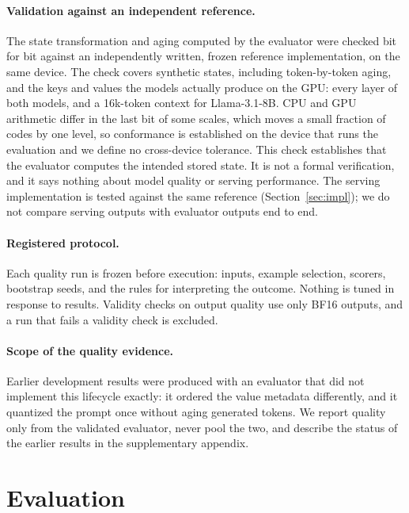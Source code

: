 \documentclass{article}
\begin{document}
\paragraph{Validation against an independent reference.}
The state transformation and aging computed by the evaluator were checked bit for bit against an
independently written, frozen reference implementation, on the same device. The check covers synthetic
states, including token-by-token aging, and the keys and values the models actually produce on the GPU:
every layer of both models, and a 16k-token context for Llama-3.1-8B. CPU and GPU arithmetic differ in
the last bit of some scales, which moves a small fraction of codes by one level, so conformance is
established on the device that runs the evaluation and we define no cross-device tolerance. This check
establishes that the evaluator computes the intended stored state. It is not a formal verification, and
it says nothing about model quality or serving performance. The serving implementation is tested
against the same reference (Section~\ref{sec:impl}); we do not compare serving outputs with evaluator
outputs end to end.

\paragraph{Registered protocol.}
Each quality run is frozen before execution: inputs, example selection, scorers, bootstrap seeds, and
the rules for interpreting the outcome. Nothing is tuned in response to results. Validity checks on
output quality use only BF16 outputs, and a run that fails a validity check is excluded.

\paragraph{Scope of the quality evidence.}
Earlier development results were produced with an evaluator that did not implement this lifecycle
exactly: it ordered the value metadata differently, and it quantized the prompt once without aging
generated tokens. We report quality only from the validated evaluator, never pool the two, and
describe the status of the earlier results in the supplementary appendix.

\section{Evaluation}
\label{sec:eval}
\end{document}
